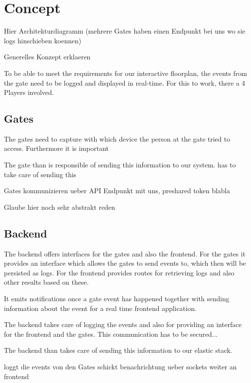 \chapter{Concept}

Hier Architekturdiagramm (mehrere Gates haben einen Endpunkt bei uns wo sie logs hinschieben koennen)

Generelles Konzept erklaeren

To be able to meet the requirements for our interactive floorplan, the events from the gate need to be logged and displayed in real-time. For this to work, there a 4 Players involved.


\section{Gates}
\label{Gates}

The gates need to capture with which device the person at the gate tried to access. Furthermore it is important 

The gate than is responsible of sending this information to our system. has to take care of sending this 

Gates kommunizieren ueber API Endpunkt mit uns, preshared token blabla

Glaube hier noch sehr abstrakt reden

\section{Backend}
\label{Backend}

The backend offers interfaces for the gates and also the frontend. For the gates it provides an interface which allows the gates to send events to, which then will be persisted as logs.
For the frontend provides routes for retrieving logs and also other results based on these.

It emits notifications once a gate event has happened together with sending information about the event for a real time frontend application.




The backend takes care of logging the events and also for providing an interface for the frontend and the gates.
This communication has to be secured...

The backend than takes care of sending this information to our elastic stack.

loggt die events von den Gates
schickt benachrichtung ueber sockets weiter an frontend

